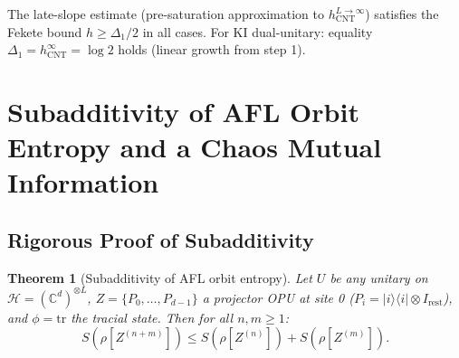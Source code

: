 \documentclass[12pt,a4paper]{article}
\newtheorem{theorem}{Theorem}[section]
\newcommand{\CC}{\mathbb{C}}
\newcommand{\Hil}{\mathcal{H}}
\begin{document}
\vspace{4pt}\noindent
The late-slope estimate (pre-saturation approximation to $h_\mathrm{CNT}^{L\to\infty}$)
satisfies the Fekete bound $h\ge\Delta_1/2$ in all cases.
For KI dual-unitary: equality $\Delta_1 = h_\mathrm{CNT}^{\infty} = \log 2$ holds (linear growth from step 1).

\section{Subadditivity of AFL Orbit Entropy and a Chaos Mutual Information}
\label{sec:subadditivity}

\subsection{Rigorous Proof of Subadditivity}

\begin{theorem}[Subadditivity of AFL orbit entropy]\label{thm:orbit_subadd}
Let $U$ be any unitary on $\Hil=(\CC^d)^{\otimes L}$, $Z=\{P_0,\ldots,P_{d-1}\}$
a projector OPU at site 0 ($P_i=|i\rangle\langle i|\otimes I_\mathrm{rest}$),
and $\phi=\mathrm{tr}$ the tracial state.  Then for all $n,m\ge 1$:
\begin{equation}\label{eq:orbit_subadd}
  S(\rho[Z^{(n+m)}]) \le S(\rho[Z^{(n)}]) + S(\rho[Z^{(m)}]).
\end{equation}
\end{theorem}
\end{document}
